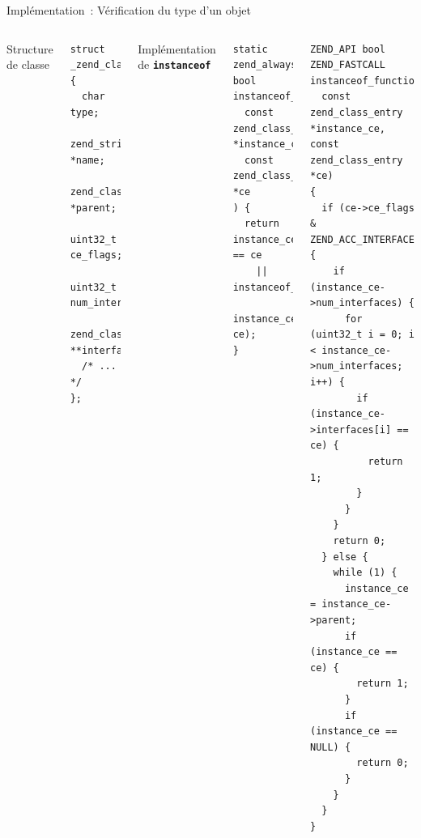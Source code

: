 \documentclass[10pt]{beamer}
\begin{document}
\begin{frame}[fragile]{Implémentation~: Vérification du type d'un objet}
      \begin{columns}[T,onlytextwidth]
        Structure de classe
    \begin{verbatim}
struct _zend_class_entry {
  char type;
  zend_string *name;
  zend_class_entry *parent;
  uint32_t ce_flags;
  uint32_t num_interfaces;
  zend_class_entry **interfaces;
  /* ... */
};
    \end{verbatim}
    Implémentation de \texttt{\textbf{instanceof}}
    \begin{verbatim}
static zend_always_inline bool
instanceof_function(
  const zend_class_entry *instance_ce,
  const zend_class_entry *ce
) {
  return instance_ce == ce
    || instanceof_function_slow(
               instance_ce, ce);
}
    \end{verbatim}
    
    \begin{verbatim}
ZEND_API bool ZEND_FASTCALL instanceof_function_slow(
  const zend_class_entry *instance_ce, const zend_class_entry *ce)
{
  if (ce->ce_flags & ZEND_ACC_INTERFACE) {
    if (instance_ce->num_interfaces) {
      for (uint32_t i = 0; i < instance_ce->num_interfaces; i++) {
        if (instance_ce->interfaces[i] == ce) {
          return 1;
        }
      }
    }
    return 0;
  } else {
    while (1) {
      instance_ce = instance_ce->parent;
      if (instance_ce == ce) {
        return 1;
      }
      if (instance_ce == NULL) {
        return 0;
      }
    }
  }
}
    \end{verbatim}
      \end{columns}
\end{frame}
\end{document}
